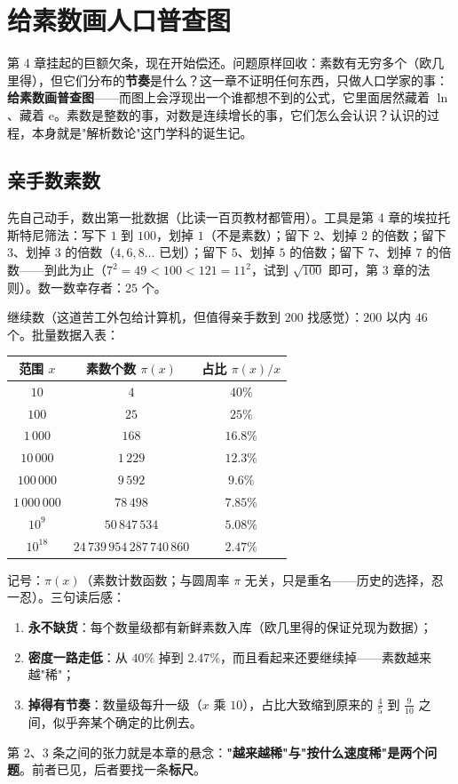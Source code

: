 \chapter{给素数画人口普查图}

第 4 章挂起的巨额欠条，现在开始偿还。问题原样回收：素数有无穷多个（欧几里得），但它们分布的\textbf{节奏}是什么？这一章不证明任何东西，只做人口学家的事：\textbf{给素数画普查图}——而图上会浮现出一个谁都想不到的公式，它里面居然藏着 $\ln$、藏着 $\mathrm{e}$。素数是整数的事，对数是连续增长的事，它们怎么会认识？认识的过程，本身就是"解析数论"这门学科的诞生记。

\section{亲手数素数}

先自己动手，数出第一批数据（比读一百页教材都管用）。工具是第 4 章的埃拉托斯特尼筛法：写下 $1$ 到 $100$，划掉 $1$（不是素数）；留下 $2$、划掉 $2$ 的倍数；留下 $3$、划掉 $3$ 的倍数（$4, 6, 8\dots$ 已划）；留下 $5$、划掉 $5$ 的倍数；留下 $7$、划掉 $7$ 的倍数——到此为止（$7^2 = 49 < 100 < 121 = 11^2$，试到 $\sqrt{100}$ 即可，第 3 章的法则）。数一数幸存者：$25$ 个。

继续数（这道苦工外包给计算机，但值得亲手数到 $200$ 找感觉）：$200$ 以内 $46$ 个。批量数据入表：

\begin{center}
\begin{tabular}{ccc}
\toprule
范围 $x$ & 素数个数 $\pi(x)$ & 占比 $\pi(x)/x$ \\
\midrule
$10$ & $4$ & $40\%$ \\
$100$ & $25$ & $25\%$ \\
$1\,000$ & $168$ & $16.8\%$ \\
$10\,000$ & $1\,229$ & $12.3\%$ \\
$100\,000$ & $9\,592$ & $9.6\%$ \\
$1\,000\,000$ & $78\,498$ & $7.85\%$ \\
$10^9$ & $50\,847\,534$ & $5.08\%$ \\
$10^{18}$ & $24\,739\,954\,287\,740\,860$ & $2.47\%$ \\
\bottomrule
\end{tabular}
\end{center}

记号：$\pi(x)$（素数计数函数；与圆周率 $\pi$ 无关，只是重名——历史的选择，忍一忍）。三句读后感：
\begin{enumerate}
\item \textbf{永不缺货}：每个数量级都有新鲜素数入库（欧几里得的保证兑现为数据）；
\item \textbf{密度一路走低}：从 $40\%$ 掉到 $2.47\%$，而且看起来还要继续掉——素数越来越"稀"；
\item \textbf{掉得有节奏}：数量级每升一级（$x$ 乘 $10$），占比大致缩到原来的 $\tfrac45$ 到 $\tfrac9{10}$ 之间，似乎奔某个确定的比例去。
\end{enumerate}
第 $2$、$3$ 条之间的张力就是本章的悬念：\textbf{"越来越稀"与"按什么速度稀"是两个问题}。前者已见，后者要找一条\textbf{标尺}。

